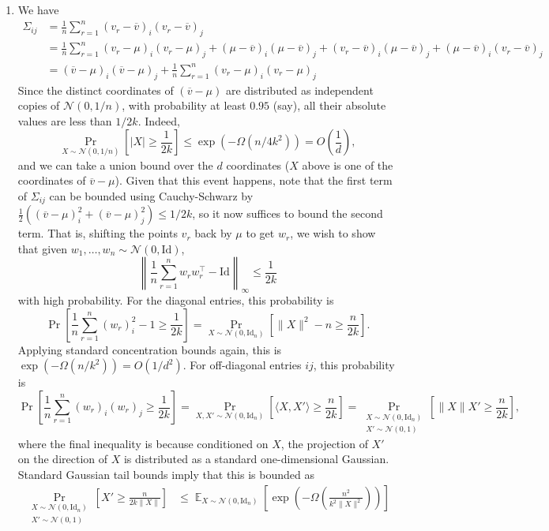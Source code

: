 \documentclass[11pt]{article}
\theoremstyle{definition}
\DeclareMathOperator{\E}{\mathbb{E}} %
\newcommand{\Id}{\mathrm{Id}}
\begin{document}
\begin{enumerate}[label=(\alph*)]
  \item We have
  \begin{align*}
    \Sigma_{ij} &= \frac{1}{n} \sum_{r=1}^n (v_r - \overline{v})_i (v_r - \overline{v})_j \\
      &= \frac{1}{n} \sum_{r=1}^n (v_r - \mu)_i (v_r - \mu)_j + (\mu - \overline{v})_i(\mu - \overline{v})_j + (v_r - \overline{v})_i(\mu - \overline{v})_j + (\mu - \overline{v})_i(v_r - \overline{v})_j \\
      &= (\overline{v} - \mu)_i(\overline{v} - \mu)_j + \frac{1}{n} \sum_{r=1}^{n} (v_r - \mu)_i (v_r - \mu)_j
  \end{align*}
  Since the distinct coordinates of $(\overline{v}-\mu)$ are distributed as independent copies of $\mathcal{N}(0,1/n)$, with probability at least $0.95$ (say), all their absolute values are less than $1/2k$. Indeed,
  \[ \Pr_{X \sim \mathcal{N}(0,1/n)}\left[ |X| \ge \frac{1}{2k} \right] \le \exp\left(-\Omega(n/4k^2)\right) = O\left(\frac{1}{d}\right), \]
  and we can take a union bound over the $d$ coordinates ($X$ above is one of the coordinates of $\overline{v}-\mu$). Given that this event happens, note that the first term of $\Sigma_{ij}$ can be bounded using Cauchy-Schwarz by $\frac{1}{2}\left( (\overline{v} - \mu)_i^2 + (\overline{v} - \mu)_j^2 \right) \le 1/2k$, so it now suffices to bound the second term. That is, shifting the points $v_r$ back by $\mu$ to get $w_r$, we wish to show that given $w_1,\ldots,w_n \sim \mathcal{N}(0,\Id)$,
  \[ \left\| \frac{1}{n} \sum_{r=1}^{n} w_r w_r^\top - \Id \right\|_\infty \le \frac{1}{2k} \]
  with high probability. For the diagonal entries, this probability is
  \[ \Pr\left[ \frac{1}{n} \sum_{r=1}^{n} (w_r)_i^2 - 1 \ge \frac{1}{2k} \right] = \Pr_{X \sim \mathcal{N}(0,\Id_n)}\left[ \|X\|^2 - n \ge \frac{n}{2k} \right].  \]
  Applying standard concentration bounds again, this is $\exp(-\Omega(n/k^2)) = O(1/d^2)$. For off-diagonal entries $ij$, this probability is
  \[ \Pr\left[ \frac{1}{n} \sum_{r=1}^{n} (w_r)_i (w_r)_j \ge \frac{1}{2k} \right] = \Pr_{X,X' \sim \mathcal{N}(0,\Id_n)}\left[ \langle X,X'\rangle \ge \frac{n}{2k} \right] = \Pr_{\substack{X \sim \mathcal{N}(0,\Id_n) \\ X' \sim \mathcal{N}(0,1)}} \left[ \|X\| X' \ge \frac{n}{2k} \right], \]
  where the final inequality is because conditioned on $X$, the projection of $X'$ on the direction of $X$ is distributed as a standard one-dimensional Gaussian. Standard Gaussian tail bounds imply that this is bounded as
  \begin{align*}
    \Pr_{\substack{X \sim \mathcal{N}(0,\Id_n) \\ X' \sim \mathcal{N}(0,1)}} \left[ X' \ge \frac{n}{2k\|X\|} \right] &\le \E_{X \sim \mathcal{N}(0,\Id_n)} \left[\exp\left( - \Omega\left(\frac{n^2}{k^2\|X\|^2}\right) \right)\right] \\

\end{align*}
\end{enumerate}
\end{document}
